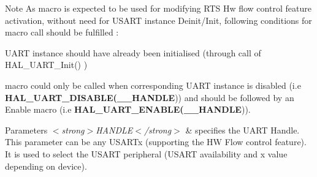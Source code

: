\begin{DoxyNote}{Note}
As macro is expected to be used for modifying R\-T\-S Hw flow control feature activation, without need for U\-S\-A\-R\-T instance Deinit/\-Init, following conditions for macro call should be fulfilled \-:
\begin{DoxyItemize}
\item U\-A\-R\-T instance should have already been initialised (through call of H\-A\-L\-\_\-\-U\-A\-R\-T\-\_\-\-Init() )
\item macro could only be called when corresponding U\-A\-R\-T instance is disabled (i.\-e {\bfseries H\-A\-L\-\_\-\-U\-A\-R\-T\-\_\-\-D\-I\-S\-A\-B\-L\-E(\-\_\-\-\_\-\-H\-A\-N\-D\-L\-E})) and should be followed by an Enable macro (i.\-e {\bfseries H\-A\-L\-\_\-\-U\-A\-R\-T\-\_\-\-E\-N\-A\-B\-L\-E(\-\_\-\-\_\-\-H\-A\-N\-D\-L\-E})). 
\end{DoxyItemize}
\end{DoxyNote}

\begin{DoxyParams}{Parameters}
{\em $<$strong$>$\-H\-A\-N\-D\-L\-E$<$/strong$>$} & specifies the U\-A\-R\-T Handle. This parameter can be any U\-S\-A\-R\-Tx (supporting the H\-W Flow control feature). It is used to select the U\-S\-A\-R\-T peripheral (U\-S\-A\-R\-T availability and x value depending on device). \\
\hline
\end{DoxyParams}

